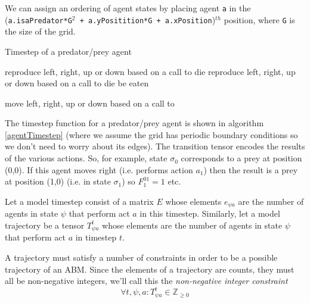\documentclass{article}
\begin{document}
We can assign an ordering of agent states by placing agent \texttt{a} in the (\texttt{a.isaPredator*G$^2$ + a.yPositition*G + a.xPosition})$^{th}$ position, where \texttt{G} is the size of the grid.

\begin{algorithm}
\caption{Timestep of a predator/prey agent}
\label{agentTimestep}
\begin{algorithmic}
    \State\Return reproduce left, right, up or down based on a call to 
  \EndIf
    \State\Return die
  \EndIf
\Else
    \State\Return reproduce left, right, up or down based on a call to 
  \EndIf
    \State\Return die
  \EndIf
    \State\Return be eaten
  \EndIf
  
\EndIf
\State \Return move left, right, up or down based on a call to 
\EndFunction
\end{algorithmic}
\end{algorithm}

The timestep function for a predator/prey agent is shown in algorithm \ref{agentTimestep} (where we assume the grid has periodic boundary conditions so we don't need to worry about its edges). The transition tensor encodes the results of the various actions. So, for example, state $\sigma_0$ corresponds to a prey at position (0,0). If this agent moves right (i.e. performs action $a_1$) then the result is a prey at position (1,0) (i.e. in state $\sigma_1$) so $F^{01}_1 = 1$ etc.

Let a model timestep consist of a matrix $E$ whose elements $e_{\psi a}$ are the number of agents in state $\psi$ that perform act $a$ in this timestep. Similarly, let a model trajectory be a tensor $T^t_{\psi a}$ whose elements are the number of agents in state $\psi$ that perform act $a$ in timestep $t$.

A trajectory must satisfy a number of constraints in order to be a possible trajectory of an ABM. Since the elements of a trajectory are counts, they must all be non-negative integers, we'll call this the \textit{non-negative integer constraint}
\begin{equation}
\forall t,\psi, a: T^t_{\psi a} \in \mathbb{Z}_{\ge 0}
\label{nonNegativeInt}
\end{equation}
\end{document}
